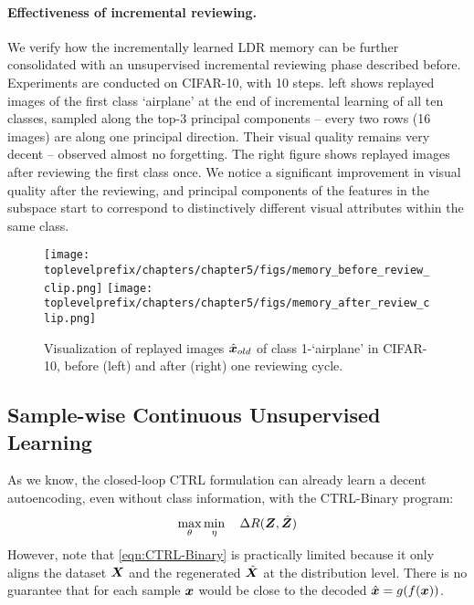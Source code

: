 \documentclass[../../book-main.tex]{subfiles}
\begin{document}
\paragraph{Effectiveness of incremental reviewing.}
We verify how the incrementally learned LDR memory can be further consolidated with an unsupervised incremental reviewing phase described before. Experiments are conducted on CIFAR-10, with 10 steps.  left shows replayed images of the first class `airplane' at the end of incremental learning of all ten classes, sampled along the top-3 principal components -- every two rows (16 images) are along one principal direction. Their  visual quality remains very decent -- observed almost no forgetting. The right figure shows replayed images after reviewing the first class once. We notice a significant improvement in visual quality after the reviewing, and principal components of the features in the subspace start to correspond to distinctively different visual attributes within the same class.

\begin{figure}
\centering
\texttt{[image: \\toplevelprefix/chapters/chapter5/figs/memory\_before\_review\_clip.png]}
\texttt{[image: \\toplevelprefix/chapters/chapter5/figs/memory\_after\_review\_clip.png]}
 \caption{\small Visualization of replayed images $\hat{\bm{x}}_{old}$ of class 1-`airplane' in CIFAR-10, before (left) and after (right) one reviewing cycle.} 
\label{fig:memory_review}
\end{figure}


\subsection{Sample-wise Continuous Unsupervised Learning}
\label{sec:sample-wise-incremental}

As we know, the closed-loop CTRL formulation can already learn a decent autoencoding, even without class information, with the  CTRL-Binary program:
\begin{align}
      \max_\theta \min_\eta \quad \Delta R(\bm{Z}, \hat{\bm{Z}}) 
 \label{eqn:CTRL-Binary}
\end{align}
However, note that \eqref{eqn:CTRL-Binary} is practically limited because it only aligns the dataset $\bm{X}$ and the regenerated $\hat {\bm{X}}$ at the distribution level. 
There is no guarantee that for each sample $\bm{x}$ would be close to the decoded $\hat {\bm{x}} = g(f(\bm{x}))$. 
\end{document}
